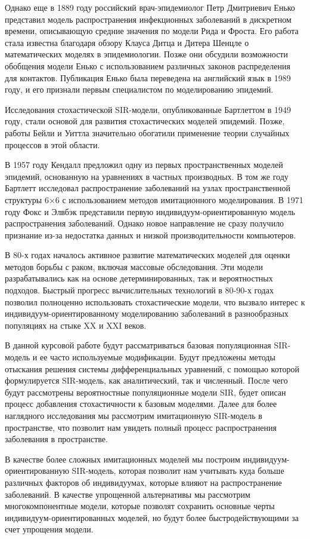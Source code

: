 \documentclass[a4paper, 14pt]{extreport}
\numberwithin{equation}{section}
\begin{document}
	Однако еще в 1889 году российский врач-эпидемиолог Петр Дмитриевич Енько представил модель распространения инфекционных заболеваний в дискретном времени, описывающую средние значения по модели Рида и Фроста. Его работа стала известна благодаря обзору Клауса Дитца и Дитера Шенцле о математических моделях в эпидемиологии. Позже они обсудили возможности обобщения модели Енько с использованием различных законов распределения для контактов. Публикация Енько была переведена на английский язык в 1989 году, и его признали первым специалистом по моделированию эпидемий.
	
	Исследования стохастической SIR-модели, опубликованные Бартлеттом в 1949 году, стали основой для развития стохастических моделей эпидемий. Позже, работы Бейли и Уиттла значительно обогатили применение теории случайных процессов в этой области.
	
	В 1957 году Кендалл предложил одну из первых пространственных моделей эпидемий, основанную на уравнениях в частных производных. В том же году Бартлетт исследовал распространение заболеваний на узлах пространственной структуры 6×6 с использованием методов имитационного моделирования. В 1971 году Фокс и Элвбэк представили первую индивидуум-ориентированную модель распространения заболеваний. Однако новое направление не сразу получило признание из-за недостатка данных и низкой производительности компьютеров.
	
	В 80-х годах началось активное развитие математических моделей для оценки методов борьбы с раком, включая массовые обследования. Эти модели разрабатывались как на основе детерминированных, так и вероятностных подходов. Быстрый прогресс вычислительных технологий в 80-90-х годах позволил полноценно использовать стохастические модели, что вызвало интерес к индивидуум-ориентированному моделированию заболеваний в разнообразных популяциях на стыке XX и XXI веков.
	
	В данной курсовой работе будут рассматриваться базовая популяционная SIR-модель и ее часто используемые модификации. Будут предложены методы отыскания решения системы дифференциальных уравнений, с помощью которой формулируется SIR-модель, как аналитический, так и численный. После чего будут рассмотрены вероятностные популяционные модели SIR, будет описан процесс добавления стохастичности к базовым моделями. Далее для более наглядного исследования мы рассмотрим имитационную SIR-модель в пространстве, что позволит нам увидеть полный процесс распространения заболевания в пространстве. 
	
	В качестве более сложных имитационных моделей мы построим индивидуум-ориентированную SIR-модель, которая позволит нам учитывать куда больше различных факторов об индивидуумах, которые влияют на распространение заболеваний. В качестве упрощенной альтернативы мы рассмотрим многокомпонентные модели, которые позволят сохранить основные черты индивидуум-ориентированных моделей, но будут более быстродействующими за счет упрощения модели.
	
\end{document}
